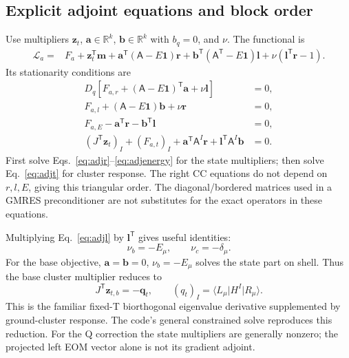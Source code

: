 \documentclass[11pt,letterpaper]{article}
\numberwithin{equation}{section}
\newcommand{\me}[3]{\langle #1\rvert #2\lvert #3\rangle}
\newcommand{\T}{\mathsf T}
\begin{document}
\subsection{Explicit adjoint equations and block order}
Use multipliers $\bm z_t$, $\bm a\in\mathbb R^k$,
$\bm b\in\mathbb R^k$ with $b_q=0$, and $\nu$. The functional is
\begin{align}
 \mathcal L_a={}&F_a+\bm z_t^{\T}\bm m
 +\bm a^{\T}(\mathsf A-E\mathbf1)\bm r
 +\bm b^{\T}(\mathsf A^{\T}-E\mathbf1)\bm l
 +\nu(\bm l^{\T}\bm r-1).
 \label{eq:excfunctional}
\end{align}
Its stationarity conditions are
\begin{align}
 D_q\left[F_{a,r}+(\mathsf A-E\mathbf1)^{\T}\bm a+\nu\bm l\right]&=0,
                                                        \label{eq:adjr}\\
 F_{a,l}+(\mathsf A-E\mathbf1)\bm b+\nu\bm r&=0,
                                                        \label{eq:adjl}\\
 F_{a,E}-\bm a^{\T}\bm r-\bm b^{\T}\bm l&=0,
                                                        \label{eq:adjenergy}\\
 (J^{\T}\bm z_t)_I+(F_{a,t})_I+
   \bm a^{\T}\mathsf A^I\bm r+
   \bm l^{\T}\mathsf A^I\bm b&=0.
                                                        \label{eq:adjt}
\end{align}
First solve Eqs.~\eqref{eq:adjr}--\eqref{eq:adjenergy} for the state
multipliers; then solve Eq.~\eqref{eq:adjt} for cluster response. The
right CC equations do not depend on $r,l,E$, giving this triangular order.
The diagonal/bordered matrices used in a GMRES preconditioner are not
substitutes for the exact operators in these equations.

Multiplying Eq.~\eqref{eq:adjl} by $\bm l^{\T}$ gives useful identities:
\begin{equation}
 \nu_b=-E_\mu,\qquad \nu_c=-\delta_\mu.
 \label{eq:nuidentities}
\end{equation}
For the base objective, $\bm a=\bm b=0$, $\nu_b=-E_\mu$ solves the state
part on shell. Thus the base cluster multiplier reduces to
\begin{equation}
 J^{\T}\bm z_{t,b}=-\bm q_t,\qquad
 (q_t)_I=\me{L_\mu}{H^I}{R_\mu}.
 \label{eq:baseeomsimplified}
\end{equation}
This is the familiar fixed-T biorthogonal eigenvalue derivative supplemented
by ground-cluster response. The code's general constrained solve reproduces
this reduction. For the Q correction the state multipliers are generally
nonzero; the projected left EOM vector alone is not its gradient adjoint.
\end{document}
